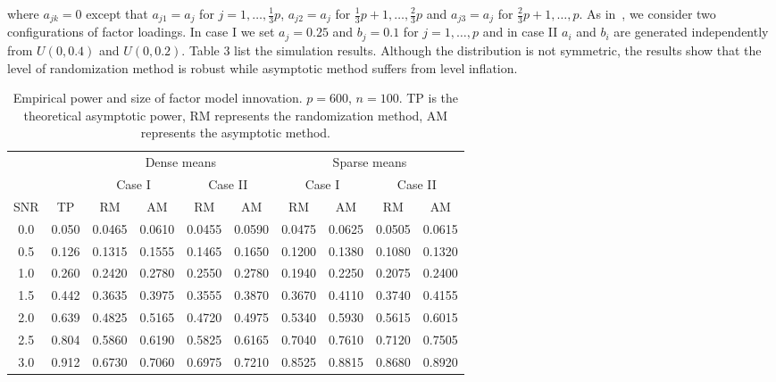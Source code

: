 \documentclass[review]{elsarticle}
\theoremstyle{plain}
\theoremstyle{definition}
\theoremstyle{remark}
\begin{document}
where $a_{jk}=0$ except that $a_{j1}=a_j$ for $j=1,\ldots,\frac{1}{3}p$, $a_{j2}=a_j$ for $\frac{1}{3}p+1,\ldots,\frac{2}{3}p$ and $a_{j3}=a_j$ for $\frac{2}{3}p+1,\ldots,p$.
As in~\cite{fan2007to}, we consider two configurations of factor loadings. In  case I we set $a_j=0.25$ and $b_j=0.1$ for $j=1,\ldots, p$ and in case II $a_i$ and $b_i$ are generated independently from $U(0,0.4)$ and $U(0,0.2)$.
Table 3 list the simulation results. Although the distribution is not symmetric, the results show that the level of randomization method is robust while asymptotic method suffers from level inflation.

\begin{table}[ht]
    \caption{Empirical power and size of factor model innovation.  $p=600$, $n=100$. TP is the theoretical asymptotic power, RM represents the randomization method, AM represents the asymptotic method.}
    \centering
    \begin{tabular}{cccccccccc}
          \toprule
          & & \multicolumn{4}{c}{Dense means} &\multicolumn{4}{c}{Sparse means}\\
          \cmidrule(r){3-6}\cmidrule(r){7-10}
          & & \multicolumn{2}{c}{Case I} & \multicolumn{2}{c}{Case II} & \multicolumn{2}{c}{Case I}& \multicolumn{2}{c}{Case II}\\
          \cmidrule(r){3-4}  \cmidrule(r){5-6} \cmidrule(r){7-8}  \cmidrule(r){9-10}
           SNR& TP & RM & AM & RM & AM & RM & AM & RM & AM  \\ 
            \midrule
        0.0 & 0.050 & 0.0465 & 0.0610 & 0.0455 & 0.0590 & 0.0475 & 0.0625 & 0.0505 & 0.0615 \\ 
          0.5 & 0.126 & 0.1315 & 0.1555 & 0.1465 & 0.1650 & 0.1200 & 0.1380 & 0.1080 & 0.1320 \\ 
            1.0 & 0.260 & 0.2420 & 0.2780 & 0.2550 & 0.2780 & 0.1940 & 0.2250 & 0.2075 & 0.2400 \\ 
              1.5 & 0.442 & 0.3635 & 0.3975 & 0.3555 & 0.3870 & 0.3670 & 0.4110 & 0.3740 & 0.4155 \\ 
                2.0 & 0.639 & 0.4825 & 0.5165 & 0.4720 & 0.4975 & 0.5340 & 0.5930 & 0.5615 & 0.6015 \\ 
                  2.5 & 0.804 & 0.5860 & 0.6190 & 0.5825 & 0.6165 & 0.7040 & 0.7610 & 0.7120 & 0.7505 \\ 
                    3.0 & 0.912 & 0.6730 & 0.7060 & 0.6975 & 0.7210 & 0.8525 & 0.8815 & 0.8680 & 0.8920 \\ 
        \bottomrule
    \end{tabular}
\end{table}
\end{document}
